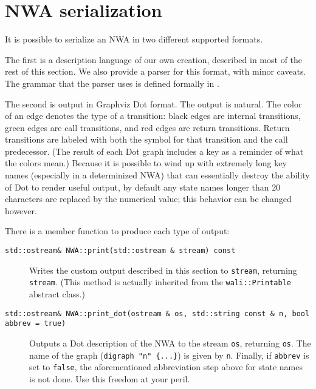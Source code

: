 \section{NWA serialization}
\label{Se:serialization}

\newenvironment{grammar}{\begin{equation*}\begin{array}{lrl}}{\end{array}\end{equation*}}
\newcommand{\nonterm}[1]{\ensuremath{\langle}\textit{#1}\ensuremath{\rangle}}
\newcommand{\term}[1]{\textrm`\texttt{#1}\textrm'}
\newcommand{\cfgsp}{\ \ }


It is possible to serialize an NWA in two different supported
formats.

The first is a description language of our own creation, described in
most of the rest of this section. We also provide a parser for this format,
with minor caveats. The grammar that the parser uses is defined
formally in .

The second is output in Graphviz Dot format. The output is
natural. The color of an edge denotes the type of a transition: black
edges are internal transitions, green edges are call transitions, and
red edges are return transitions. Return transitions are labeled with
both the symbol for that transition and the call predecessor. (The
result of each Dot graph includes a key as a reminder of what the
colors mean.) Because it is possible to wind up with extremely long
key names (especially in a determinized NWA) that can essentially
destroy the ability of Dot to render useful output, by default any
state names longer than 20 characters are replaced by the numerical
value; this behavior can be changed however.

There is a member function to produce each type of output:
\begin{description}
  \item[\texttt{std::ostream\& NWA::print(std::ostream \& stream) const}]
    Writes the custom output described in this section
    to \texttt{stream}, returning \texttt{stream}.
    (This method is actually inherited from
    the \texttt{wali::Printable} abstract class.)

  \item[\texttt{std::ostream\& NWA::print\_dot(ostream \& os,
    std::string const \& n, bool abbrev = true)}] Outputs a Dot
    description of the NWA to the stream \texttt{os}, returning \texttt{os}.
    The name of the graph (\texttt{digraph "n" \{...\}}) is given
    by \texttt{n}. Finally, if \texttt{abbrev} is set
    to \texttt{false}, the aforementioned abbreviation step above for state names is
    not done. Use this freedom at your peril.
\end{description}

